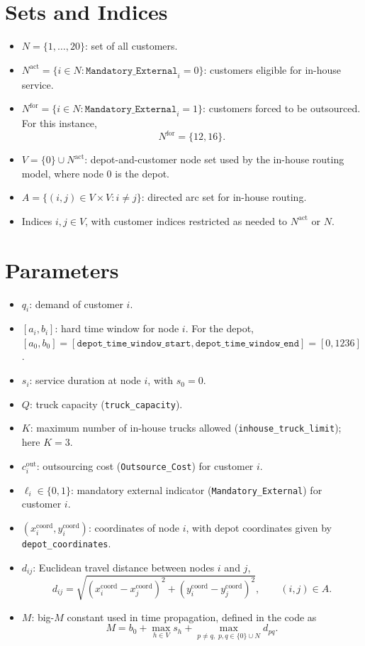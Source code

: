 \section*{Sets and Indices}

\begin{itemize}
    \item $N = \{1,\dots,20\}$: set of all customers.
    \item $N^{\mathrm{act}} = \{i \in N : \texttt{Mandatory\_External}_i = 0\}$: customers eligible for in-house service.
    \item $N^{\mathrm{for}} = \{i \in N : \texttt{Mandatory\_External}_i = 1\}$: customers forced to be outsourced. For this instance,
    \[
    N^{\mathrm{for}} = \{12,16\}.
    \]
    \item $V = \{0\} \cup N^{\mathrm{act}}$: depot-and-customer node set used by the in-house routing model, where node $0$ is the depot.
    \item $A = \{(i,j)\in V\times V : i\neq j\}$: directed arc set for in-house routing.
    \item Indices $i,j \in V$, with customer indices restricted as needed to $N^{\mathrm{act}}$ or $N$.
\end{itemize}

\section*{Parameters}

\begin{itemize}
    \item $q_i$: demand of customer $i$.
    \item $[a_i,b_i]$: hard time window for node $i$. For the depot, $[a_0,b_0] = [\texttt{depot\_time\_window\_start}, \texttt{depot\_time\_window\_end}] = [0,1236]$.
    \item $s_i$: service duration at node $i$, with $s_0=0$.
    \item $Q$: truck capacity (\texttt{truck\_capacity}).
    \item $K$: maximum number of in-house trucks allowed (\texttt{inhouse\_truck\_limit}); here $K=3$.
    \item $c_i^{\mathrm{out}}$: outsourcing cost (\texttt{Outsource\_Cost}) for customer $i$.
    \item $\ell_i \in \{0,1\}$: mandatory external indicator (\texttt{Mandatory\_External}) for customer $i$.
    \item $(x_i^{\mathrm{coord}},y_i^{\mathrm{coord}})$: coordinates of node $i$, with depot coordinates given by \texttt{depot\_coordinates}.
    \item $d_{ij}$: Euclidean travel distance between nodes $i$ and $j$,
    \[
    d_{ij} = \sqrt{(x_i^{\mathrm{coord}}-x_j^{\mathrm{coord}})^2 + (y_i^{\mathrm{coord}}-y_j^{\mathrm{coord}})^2}, \qquad (i,j)\in A.
    \]
    \item $M$: big-$M$ constant used in time propagation, defined in the code as
    \[
    M = b_0 + \max_{h\in V} s_h + \max_{p\neq q,\; p,q\in \{0\}\cup N} d_{pq}.
    \]
\end{itemize}

